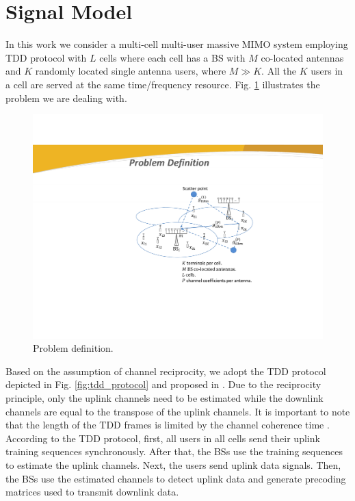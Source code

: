 \documentclass[journal,12pt,onecolumn]{IEEEtran}
\begin{document}
\section{Signal Model}
In this work we consider a multi-cell multi-user massive MIMO system employing TDD protocol with $L$ cells where each cell has a BS with $M$ co-located  antennas and $K$ randomly located single antenna users, where $M \gg K$. All the $K$ users in a cell are served at the same time/frequency resource. Fig. \ref{fig:problem_definition} illustrates the problem we are dealing with.

\begin{figure}[H]
\centering
\includegraphics[trim = 0mm 0mm 0mm 0mm, clip=true, scale=1]{cropped_problem_definition.pdf}
\caption{Problem definition.}
\label{fig:problem_definition}
\end{figure}

Based on the assumption of channel reciprocity, we adopt the TDD protocol depicted in Fig. \ref{fig:tdd_protocol} and proposed in \cite{marzetta:how_much_training}. Due to the reciprocity principle, only the uplink channels need to be estimated while the downlink channels are equal to the transpose of the uplink channels. It is important to note that the length of the TDD frames is limited by the channel coherence time \cite{marzetta:how_much_training, caire:achivable_dl_rates}. According to the TDD protocol, first, all users in all cells send their uplink training sequences synchronously. After that, the BSs use the training sequences to estimate the uplink channels. Next, the users send uplink data signals. Then, the BSs use the estimated channels to detect uplink data and generate precoding matrices used to transmit downlink data.
\end{document}
